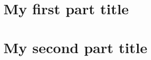 \documentclass[12pt,a4paper,openright,tikz]{lmpsthesis}
\begin{document}
\frontmatter
\setcounter{page}{1}                        %


\mainmatter


\clearpage\null

\part{My first part title}


\clearpage\null

\part{My second part title}


\clearpage\null

\thesisappendix


\clearpage\null

\backmatter
\printbibliography[heading=bibintoc]
\end{document}
